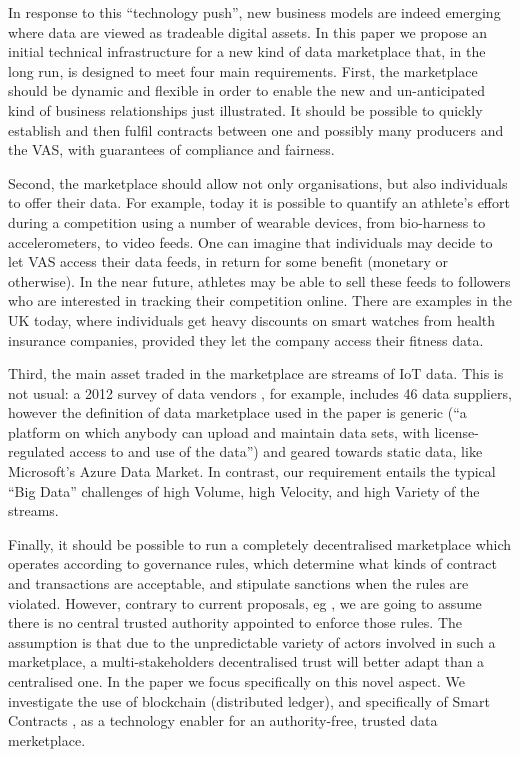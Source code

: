 \documentclass[chi_draft]{sigchi}
\begin{document}
In response to this ``technology push'', new business models are indeed emerging \cite{Stahl2016,7765669} where data are viewed as tradeable digital assets. 
In this paper we propose an initial technical infrastructure for a new kind of data marketplace that, in the long run, is designed to meet four main requirements.
First, the marketplace should be dynamic and flexible in order to enable the new and un-anticipated kind of business relationships just illustrated. It should be possible to quickly  establish and then fulfil contracts between one and possibly many producers and the VAS, with guarantees of compliance and fairness.

Second, the marketplace should allow not only organisations, but also individuals to offer their data. 
%
For example, today it is possible to quantify an athlete's effort during a competition using a number of wearable devices, from bio-harness to accelerometers, to video feeds.
One can imagine that individuals may decide to let VAS access their data feeds, in return for some benefit (monetary or otherwise).
In the near future, athletes may be able to sell these feeds to followers who are interested in tracking their competition online.
There are examples in the UK today, where individuals get heavy discounts on smart watches from health insurance companies, provided they let the company access their fitness data.

Third, the main asset traded in the marketplace are streams of IoT data. This is not usual: a 2012 survey of data vendors \cite{Schomm2013}, for example, includes 46 data suppliers, however the definition of data marketplace used in the paper is generic (``a platform on which anybody can upload and maintain data sets, with license-regulated access to and use of the data'') and geared towards static data, like Microsoft's Azure Data Market.
In contrast, our requirement entails the typical ``Big Data'' challenges of high Volume, high Velocity, and high Variety of the streams.

Finally, it should be possible to run a completely decentralised marketplace which operates according to governance rules, which determine what kinds of contract and transactions are acceptable, and stipulate sanctions when the rules are violated. 
However, contrary to current proposals, eg \cite{Cao:2016:MMR:2926746.2883611}, we are going to assume  there is no central trusted authority appointed to enforce those rules. The assumption is that due to the unpredictable variety of actors involved in such a marketplace, a multi-stakeholders decentralised trust will better adapt than a centralised one.
In the paper we focus specifically on this novel aspect. We investigate the use of blockchain (distributed ledger), and specifically of Smart Contracts \cite{Buterin2014}, as a technology enabler for an authority-free, trusted data merketplace.
\end{document}
